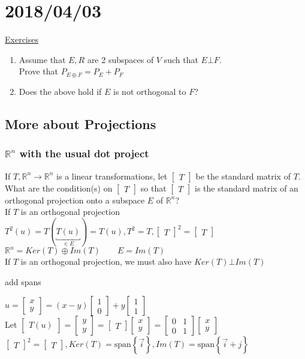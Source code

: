 \documentclass[12pt]{article}
\renewcommand{\v}[1]{\overrightarrow{#1}}
\newcommand\m[1]{\begin{bmatrix}#1\end{bmatrix}}
\newcommand{\real}[0]{\mathbb{R}}
\newenvironment{block}[1][Label]{\underline{#1}\par}{}
\newcommand{\uu}[1]{\underbracket{#1}}
\newcommand{\todo}[0]{\text{\textcolor{red}{\textbackslash\textbackslash TODO \ }}}
\newcommand{\bb}[1]{\left\{#1\right\}}
\newcommand{\sspan}[1]{\text{span}\bb{#1}}
\begin{document}
	\todo
	
	\section{2018/04/03}
	
	\begin{block}[Exercises]
		\begin{enumerate}
			\item Assume that $E, R$ are 2 subspaces of $V$ such that $E \bot F$. \\
			Prove that $P_{E \oplus F} = P_E + P_F$
			\item Does the above hold if $E$ is not orthogonal to $F$?
		\end{enumerate}
	\end{block}

	\subsection{More about Projections}
	
	\subsubsection{$\real^n$ with the usual dot project}
	
	If $T, \real^n \rightarrow \real^n$ is a linear transformations, let $\m{T}$ be the standard matrix of $T$. \\
	What are the condition(s) on $\m{T}$ so that $\m{T}$ is the standard matrix of an orthogonal projection onto a subspace $E$ of $\real^n$? \\
	
	If $T$ is an  orthogonal projection \\
	$T^2(u) = T(\uu{T(u)}_{\in E}) = T(u), T^2 = T, \m{T}^2 = \m{T}$ \\
	
	$\real^n = Ker(T) \oplus Im(T) \qquad E = Im(T)$ \\
	If $T$ is an orthogonal projection, we must also have $Ker(T) \bot Im(T)$ 
	
	\todo add spans 
	
	$u = \m{x \\ y} = (x - y) \m{1 \\ 0} + y \m{1 \\ 1}$ \\
	Let $\m{T(u)} = \m{y \\ y} = \m{T} \m{x \\ y} = \m{0 & 1 \\ 0 & 1} \m{x \\ y}$ \\
	$\m{T}^2 = \m{T}, Ker(T) = \sspan{\v{i}}, Im(T) = \sspan{\v{i} + j}$ \\
	
\end{document}
